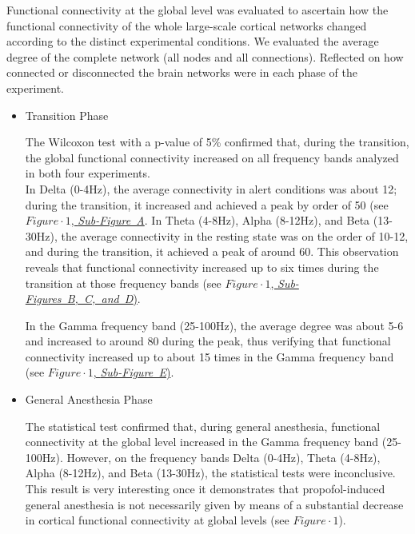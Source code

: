 \documentclass[twoside]{article}
\begin{document}
\begin{multicols}{2}



Functional connectivity at the global level was evaluated to ascertain how the functional connectivity of the whole large-scale cortical networks changed according to the distinct experimental conditions. We evaluated the average degree of the complete network (all nodes and all connections). Reflected on how connected or disconnected the brain networks were in each phase of the experiment.

\begin{itemize}

\item Transition Phase

 The Wilcoxon test with a p-value of 5\% confirmed that, during the transition, the global functional connectivity increased on all frequency bands analyzed in both four experiments.
\enlargethispage{\baselineskip}\\

In Delta (0-4Hz), the average connectivity in alert conditions was about 12; during the transition, it increased and achieved a peak by order of 50 (see \hyperlink{FIGURE1}{$Figure \cdot 1$, \textit{\mbox{Sub-Figure A}}}.
In Theta (4-8Hz), Alpha (8-12Hz), and Beta (13-30Hz), the average connectivity in the resting state was on the order of 10-12, and during the transition, it achieved a peak of around 60. This observation reveals that functional connectivity increased up to six times during the transition at those frequency bands (see \hyperlink{FIGURE1}{$Figure \cdot 1$, \textit{\mbox{Sub-Figures B, C, and D}})}.

In the Gamma frequency band (\mbox{25-100Hz}), the average degree was about 5-6 and increased to around 80 during the peak, thus verifying that functional connectivity increased up to about 15 times in the Gamma frequency band (see \hyperlink{FIGURE1}{$Figure \cdot 1$, \textit{\mbox{Sub-Figure E}})}.



\item General Anesthesia Phase

The statistical test confirmed that, during general anesthesia, functional connectivity at the global level increased in the Gamma frequency band (25-100Hz). However, on the frequency bands Delta (0-4Hz), Theta (4-8Hz), Alpha (8-12Hz), and Beta (13-30Hz), the statistical tests were inconclusive. This result is very interesting once it demonstrates that propofol-induced general anesthesia is not necessarily given by means of a substantial decrease in cortical functional connectivity at global levels (see \hyperlink{FIGURE1}{$Figure \cdot 1$}).


\end{itemize}
\end{multicols}
\end{document}
